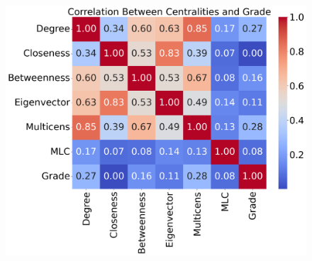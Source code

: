 \documentclass[10pt,letterpaper]{article}
\begin{document}
\begin{figure}[h!]
\begin{minipage}[b]{0.28\linewidth}
	\centering
	\includegraphics[width=\textwidth]{figs/fig36-npas4_arnt-corr.png}
	\subcaption{}
\end{minipage}

\vspace{0.5cm}


\end{figure}
\end{document}
